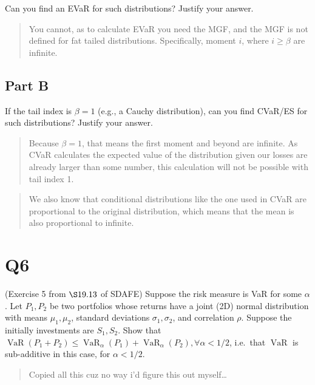 \documentclass[
  oneside]{book}
\begin{document}
Can you find an EVaR for such distributions? Justify your answer.

\begin{quote}
You cannot, as to calculate EVaR you need the MGF, and the MGF is not defined for fat tailed distributions. Specifically, moment \(i\), where \(i\geq\beta\) are infinite.
\end{quote}

\hypertarget{part-b-12}{%
\subsection{Part B}\label{part-b-12}}

If the tail index is \(\beta = 1\) (e.g., a Cauchy distribution), can you find CVaR/ES for such distributions? Justify your answer.

\begin{quote}
Because \(\beta=1\), that means the first moment and beyond are infinite. As CVaR calculates the expected value of the distribution given our losses are already larger than some number, this calculation will not be possible with tail index 1.
\end{quote}

\begin{quote}
We also know that conditional distributions like the one used in CVaR are proportional to the original distribution, which means that the mean is also proportional to infinite.
\end{quote}

\hypertarget{q6}{%
\section{Q6}\label{q6}}

(Exercise 5 from \(\S 19.13\) of SDAFE) Suppose the risk measure is VaR for some \(\alpha\). Let \(P_1, P_2\) be two portfolios whose returns have a joint (2D) normal distribution with means \(\mu_1, \mu_2\), standard deviations \(\sigma_1, \sigma_2\), and correlation \(\rho\). Suppose the initially investments are \(S_1, S_2\). Show that \(\operatorname{VaR}\left(P_1+P_2\right) \leq \operatorname{VaR}_\alpha\left(P_1\right)+\operatorname{VaR}_\alpha\left(P_2\right), \forall \alpha<1 / 2\), i.e.~that \(\operatorname{VaR}\) is sub-additive in this case, for \(\alpha<1 / 2\).

\begin{quote}
Copied all this cuz no way i'd figure this out myself\ldots{}
\end{quote}
\end{document}
